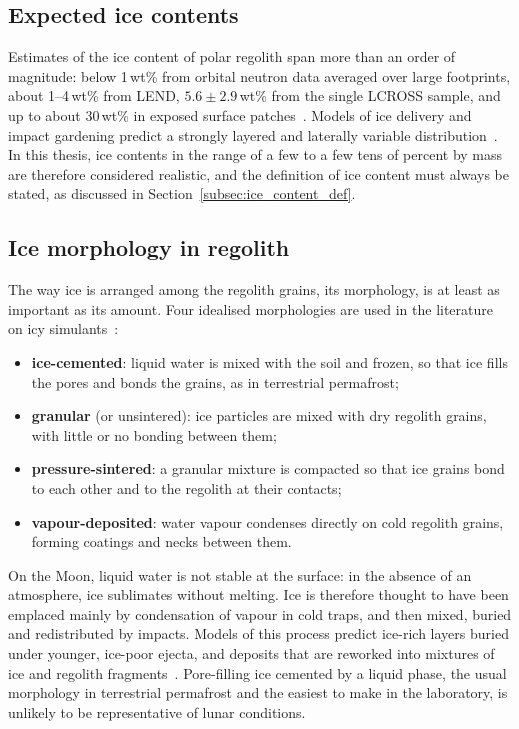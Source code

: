 \subsection{Expected ice contents}

Estimates of the ice content of polar regolith span more than an order of magnitude: below 1\,wt\% from orbital neutron data averaged over large footprints, about 1--4\,wt\% from LEND, $5.6\pm2.9$\,wt\% from the single LCROSS sample, and up to about 30\,wt\% in exposed surface patches~\cite{feldman2001,mitrofanov2010,colaprete2010,li2018}. Models of ice delivery and impact gardening predict a strongly layered and laterally variable distribution~\cite{cannon2020,cannonbritt2020}. In this thesis, ice contents in the range of a few to a few tens of percent by mass are therefore considered realistic, and the definition of ice content must always be stated, as discussed in Section~\ref{subsec:ice_content_def}.

\subsection{Ice morphology in regolith}
\label{subsec:morphology}

The way ice is arranged among the regolith grains, its morphology, is at least as important as its amount. Four idealised morphologies are used in the literature on icy simulants~\cite{johnson2024,ricardo2026}:
\begin{itemize}
    \item \textbf{ice-cemented}: liquid water is mixed with the soil and frozen, so that ice fills the pores and bonds the grains, as in terrestrial permafrost;
    \item \textbf{granular} (or unsintered): ice particles are mixed with dry regolith grains, with little or no bonding between them;
    \item \textbf{pressure-sintered}: a granular mixture is compacted so that ice grains bond to each other and to the regolith at their contacts;
    \item \textbf{vapour-deposited}: water vapour condenses directly on cold regolith grains, forming coatings and necks between them.
\end{itemize}

On the Moon, liquid water is not stable at the surface: in the absence of an atmosphere, ice sublimates without melting. Ice is therefore thought to have been emplaced mainly by condensation of vapour in cold traps, and then mixed, buried and redistributed by impacts. Models of this process predict ice-rich layers buried under younger, ice-poor ejecta, and deposits that are reworked into mixtures of ice and regolith fragments~\cite{cannon2020,cannonbritt2020}. Pore-filling ice cemented by a liquid phase, the usual morphology in terrestrial permafrost and the easiest to make in the laboratory, is unlikely to be representative of lunar conditions.


